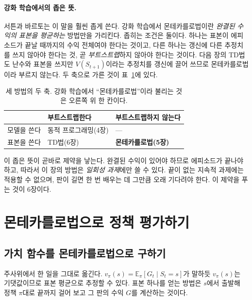 \documentclass[11pt,a4paper]{article}
\newcommand{\E}{\mathbb{E}}
\begin{document}
\paragraph{강화 학습에서의 좁은 뜻.}
서튼과 바르토\cite{sutton}는 이 말을 훨씬 좁게 쓴다. 강화 학습에서 몬테카를로법이란
\emph{완결된 수익의 표본을 평균하는} 방법만을 가리킨다. 좁히는 조건은 둘이다. 하나는 표본이
에피소드가 끝날 때까지의 수익 전체여야 한다는 것이고, 다른 하나는 갱신에 다른 추정치를 쓰지 않아야
한다는 것, 곧 \emph{부트스트랩}하지 않아야 한다는 것이다. 다음 장의 TD법도 난수와 표본을 쓰지만
$V(S_{t+1})$이라는 추정치를 갱신에 끌어 쓰므로 몬테카를로법이라 부르지 않는다.
두 축으로 가른 것이 표~\ref{tab:mc-scope}에 있다.

\begin{table}[htbp]
\centering
\caption{세 방법의 두 축. 강화 학습에서 ``몬테카를로법''이라 불리는 것은 오른쪽 위 한 칸이다.}
\label{tab:mc-scope}
\small
\begin{tabular}{@{}lll@{}}
\toprule
 & 부트스트랩한다 & 부트스트랩하지 않는다 \\
\midrule
모델을 쓴다   & 동적 프로그래밍(4장) & --- \\
표본을 쓴다   & TD법(6장)            & \textbf{몬테카를로법(5장)} \\
\bottomrule
\end{tabular}
\end{table}

이 좁은 뜻이 곧바로 제약을 낳는다. 완결된 수익이 있어야 하므로 에피소드가 끝나야 하고, 따라서 이
장의 방법은 \emph{일회성 과제}에만 쓸 수 있다. 끝이 없는 지속적 과제에는 적용할 수 없으며, 판이
길면 한 번 배우는 데 그만큼 오래 기다려야 한다. 이 제약을 푸는 것이 6장이다.

\section{몬테카를로법으로 정책 평가하기}
\label{sec:eval}

\subsection{가치 함수를 몬테카를로법으로 구하기}
\label{sec:one-state}

주사위에서 한 일을 그대로 옮긴다. $v_\pi(s) = \E_\pi[G_t \mid S_t=s]$가 말하듯 $v_\pi(s)$는 기댓값이므로 표본 평균으로
추정할 수 있다. 표본 하나를 얻는 방법은 $s$에서 출발해 정책 $\pi$대로 끝까지 걸어 보고 그 판의 수익
$G$를 계산하는 것이다.
\end{document}

